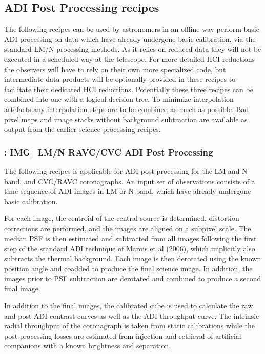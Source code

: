 
\subsection{ADI Post Processing recipes}
\label{ssec:ADI_postprocessing}



The following recipes can be used by astronomers in an offline way
perform basic ADI processing on data which have already undergone
basic calibration, via the standard LM/N processing methods.  As it
relies on reduced data they will not be executed in a scheduled way at
the telescope. For more detailed HCI reductions the observers will
have to rely on their own more specialized code, but intermediate data
products will be optionally provided in these recipes to facilitate
their dedicated HCI reductions. Potentially these three recipes can be combined into one with a logical decision tree. To minimize interpolation artefacts any interpolation steps are to be combined as much as possible. Bad pixel maps and image stacks without background subtraction are available as output from the earlier science processing recipes.

\subsubsection{: IMG\_LM/N RAVC/CVC ADI Post Processing}
\label{sssec:adi_img_vc}


The following recipes is applicable for ADI post processing for the LM
and N band, and CVC/RAVC coronagraphs. An input set of
observations consists of a time sequence of ADI images in LM or N
band, which have already undergone basic calibration. 

For each image, the centroid of the central source is determined,
distortion corrections are performed, and the images are aligned on a
subpixel scale. The median PSF is then estimated and subtracted from
all images following the first step of the standard ADI technique of
Marois et al (2006), which implicitly also subtracts the thermal background.
Each image is then derotated using the known
position angle and coadded to produce the final science image. In
addition, the images prior to PSF subtraction are derotated and
combined to produce a second final image.

In addition to the final images, the calibrated cube is used to calculate the raw and post-ADI contrast curves as
well as the ADI throughput curve. The intrinsic radial throughput of
the coronagraph is taken from static calibrations while the
post-processing losses are estimated from injection and retrieval of
artificial companions with a known brightness and separation.

